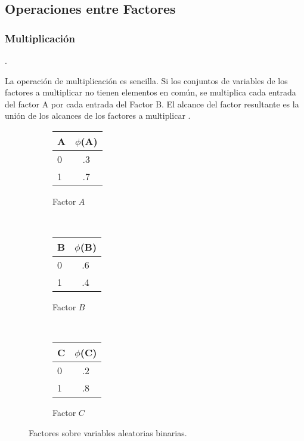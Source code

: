 \subsection[Operaciones]{Operaciones entre Factores}

\subsubsection{Multiplicación}

\begin{definition}[Multiplicación]

\parencite[107]{KollerFriedman2009}.
\end{definition}

La operación de multiplicación es sencilla. Si los conjuntos de variables de los factores a multiplicar no tienen elementos en común, se multiplica cada entrada del factor A por cada entrada del Factor B. El alcance del factor resultante es la unión de los alcances de los factores a multiplicar \parencite[107]{KollerFriedman2009}.


\begin{figure}
    \centering
    \begin{subfigure}[b]{0.3\textwidth}
        \centering
        \begin{tabular}{ l | c }
          A & $\phi$(A)\\ \hline
          0 & .3  \\ \hline
          1 & .7  \\
        \end{tabular}
        \caption{Factor $A$}
    \end{subfigure}
    ~ 
    \begin{subfigure}[b]{0.3\textwidth}
        \centering
        \begin{tabular}{ l | c }
          B & $\phi$(B)\\ \hline
          0 & .6  \\ \hline
          1 & .4  \\
        \end{tabular}
        \caption{Factor $B$}
    \end{subfigure}
    ~
    \begin{subfigure}[b]{0.3\textwidth}
        \centering
        \begin{tabular}{ l | c }
          C & $\phi$(C)\\ \hline
          0 & .2  \\ \hline
          1 & .8  \\
        \end{tabular}
        \caption{Factor $C$}
    \end{subfigure}
    \caption{Factores sobre variables aleatorias binarias.}\label{fig:ABC}
\end{figure}

